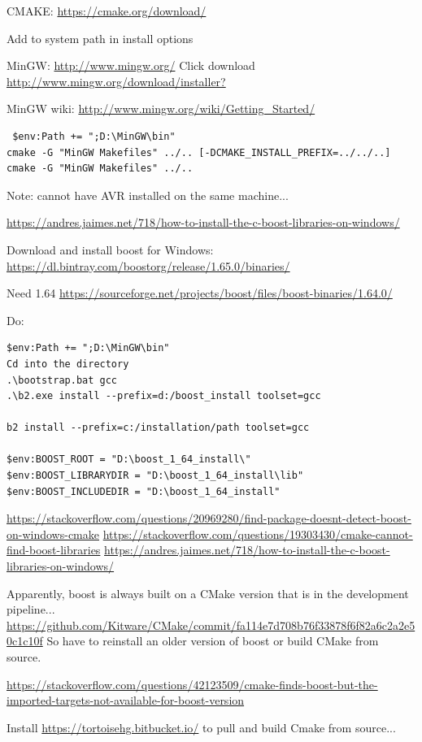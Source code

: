 \documentclass[12pt]{report}
\begin{document}
CMAKE:
\url{https://cmake.org/download/}

Add to system path in install options

MinGW: \url{http://www.mingw.org/}
Click download \url{http://www.mingw.org/download/installer?}

MinGW wiki: \url{http://www.mingw.org/wiki/Getting_Started/}
\begin{lstlisting}
 $env:Path += ";D:\MinGW\bin"
cmake -G "MinGW Makefiles" ../.. [-DCMAKE_INSTALL_PREFIX=../../..]
cmake -G "MinGW Makefiles" ../..
\end{lstlisting}
Note: cannot have AVR installed on the same machine...

\url{https://andres.jaimes.net/718/how-to-install-the-c-boost-libraries-on-windows/}

Download and install boost for Windows: \url{https://dl.bintray.com/boostorg/release/1.65.0/binaries/}

Need 1.64 \url{https://sourceforge.net/projects/boost/files/boost-binaries/1.64.0/}

Do:
\begin{lstlisting}
$env:Path += ";D:\MinGW\bin"
Cd into the directory
.\bootstrap.bat gcc
.\b2.exe install --prefix=d:/boost_install toolset=gcc

b2 install --prefix=c:/installation/path toolset=gcc

$env:BOOST_ROOT = "D:\boost_1_64_install\"
$env:BOOST_LIBRARYDIR = "D:\boost_1_64_install\lib"
$env:BOOST_INCLUDEDIR = "D:\boost_1_64_install"
\end{lstlisting}

\url{https://stackoverflow.com/questions/20969280/find-package-doesnt-detect-boost-on-windows-cmake}
\url{https://stackoverflow.com/questions/19303430/cmake-cannot-find-boost-libraries}
\url{https://andres.jaimes.net/718/how-to-install-the-c-boost-libraries-on-windows/}


Apparently, boost is always built on a CMake version that is in the development pipeline... \url{https://github.com/Kitware/CMake/commit/fa114e7d708b76f33878f6f82a6c2a2e50c1c10f} So have to reinstall an older version of boost or build CMake from source.

\url{https://stackoverflow.com/questions/42123509/cmake-finds-boost-but-the-imported-targets-not-available-for-boost-version}

Install \url{https://tortoisehg.bitbucket.io/} to pull and build Cmake from source...
\end{document}
